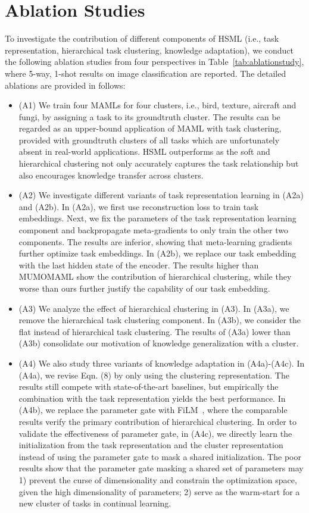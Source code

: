 \documentclass{article}
\begin{document}
\section{Ablation Studies}
\label{app:ablation}
To investigate the contribution of different components of HSML (i.e., task representation, hierarchical task clustering, knowledge adaptation), we conduct the following ablation studies from four perspectives in Table~\ref{tab:ablationstudy}, where 5-way, 1-shot results on image classification are reported. The detailed ablations are provided in follows:
\begin{itemize}[leftmargin=*]
    \item (A1) We train four MAMLs for four clusters, i.e., bird, texture, aircraft and fungi, 
    by assigning a task to its groundtruth cluster. The results can be regarded as an upper-bound application of MAML with task clustering, provided with groundtruth clusters of all tasks which are unfortunately absent in real-world applications.
    HSML outperforms as the soft and hierarchical clustering not only accurately captures the task relationship but also encourages knowledge transfer across clusters.
    \item (A2) We investigate
    different variants of task representation learning in (A2a) and 
    (A2b). 
    In (A2a), we first use reconstruction loss to train  
    task embeddings. Next, we fix the parameters of the task representation learning component and backpropagate meta-gradients to only train the other two components. The results are inferior, showing that meta-learning gradients further optimize task embeddings. In (A2b), we replace our task embedding with the last hidden state of the encoder. The results higher than 
    MUMOMAML 
    show the contribution of hierarchical clustering, while they worse than ours further justify the capability of our task embedding. 
    \item (A3) We analyze the effect of hierarchical clustering in (A3). In (A3a), we remove the hierarchical task clustering  component. In (A3b), we consider the flat instead of hierarchical task clustering. 
    The results of (A3a) lower than (A3b) consolidate our motivation of knowledge generalization with a cluster.
    \item (A4) We also study three variants of knowledge adaptation in (A4a)-(A4c). In (A4a), we revise Eqn. (8) by only using the  clustering representation. The results still compete with state-of-the-art baselines, but empirically the combination with the task representation yields the best performance. In (A4b), we replace the parameter gate  with FiLM~\cite{perez2018film}, where the comparable results verify the primary contribution of hierarchical clustering. In order to validate
    the effectiveness of parameter gate, in (A4c), we directly learn the initialization from the task representation and the cluster representation instead of using
    the parameter gate to mask a shared initialization. The poor results show that the parameter gate masking a shared set of parameters  may 1) prevent the curse of dimensionality and constrain the optimization space, given the high dimensionality of parameters; 2) serve as the warm-start for a new cluster of tasks in continual learning. 
\end{itemize}
\end{document}
